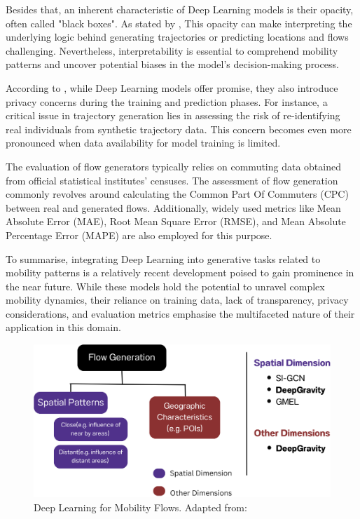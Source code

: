     Besides that, an inherent characteristic of Deep Learning models is their opacity, often called "black boxes". As stated by \cite{lucaSurveyDeepLearning2021}, This opacity can make interpreting the underlying logic behind generating trajectories or predicting locations and flows challenging. Nevertheless, interpretability is essential to comprehend mobility patterns and uncover potential biases in the model's decision-making process.
        
    According to \cite{lucaSurveyDeepLearning2021}, while Deep Learning models offer promise, they also introduce privacy concerns during the training and prediction phases. For instance, a critical issue in trajectory generation lies in assessing the risk of re-identifying real individuals from synthetic trajectory data. This concern becomes even more pronounced when data availability for model training is limited.
        
    The evaluation of flow generators typically relies on commuting data obtained from official statistical institutes' censuses. The assessment of flow generation commonly revolves around calculating the Common Part Of Commuters (CPC) between real and generated flows. Additionally, widely used metrics like Mean Absolute Error (MAE), Root Mean Square Error (RMSE), and Mean Absolute Percentage Error (MAPE) are also employed for this purpose.
        
    To summarise, integrating Deep Learning into generative tasks related to mobility patterns is a relatively recent development poised to gain prominence in the near future. While these models hold the potential to unravel complex mobility dynamics, their reliance on training data, lack of transparency, privacy considerations, and evaluation metrics emphasise the multifaceted nature of their application in this domain.   

    \begin{figure}[H]
        \centering
        \includegraphics[width=12cm]{Images/deepgravity_fig.png}
        \caption{Deep Learning for Mobility Flows. Adapted from: \cite{lucaSurveyDeepLearning2021}}
        \label{fig: DG evaluation}
    \end{figure}

